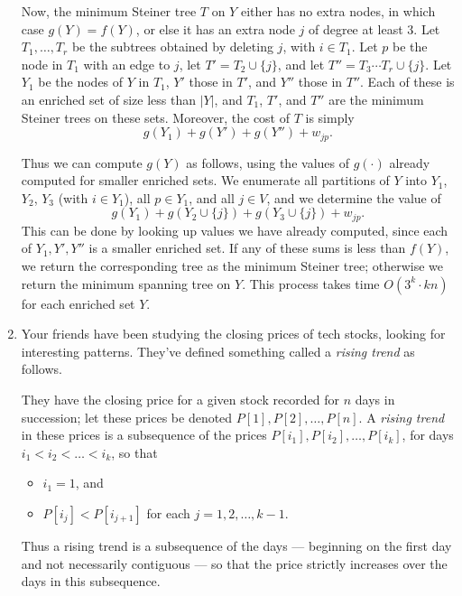 \documentclass[12pt]{article}
\begin{document}
\begin{enumerate}
{Now, the minimum Steiner tree $T$ on $Y$ either has no extra nodes,
in which case $g(Y) = f(Y)$, or else it has an
extra node $j$ of degree at least $3$.
Let $T_1, \ldots, T_r$ be the subtrees obtained by
deleting $j$, with $i \in T_1$.
Let $p$ be the node in $T_1$ with an edge to $j$,
let $T' = T_2 \cup \{j\}$, and let
$T'' = T_3 \cdots T_r \cup \{j\}$.
Let $Y_1$ be the nodes of $Y$ in $T_1$,
$Y'$ those in $T'$, and $Y''$ those in $T''$.
Each of these is an enriched set of size less than $|Y|$,
and $T_1$, $T'$, and $T''$ are the minimum Steiner trees on these sets.
Moreover, the cost of $T$ is simply
$$g(Y_1) + g(Y') + g(Y'') + w_{jp}.$$

Thus we can compute $g(Y)$ as follows, using
the values of $g(\cdot)$ already computed for smaller enriched sets.
We enumerate
all partitions of $Y$ into $Y_1$, $Y_2$, $Y_3$
(with $i \in Y_1$),
all $p \in Y_1$, and all $j \in V$, and we determine the value of
$$g(Y_1) + g(Y_2 \cup \{j\}) + g(Y_3 \cup \{j\}) + w_{jp}.$$
This can be done by looking up values we have already
computed, since each of $Y_1, Y', Y''$ is a smaller enriched set.
If any of these sums is less than $f(Y)$, we return
the corresponding tree as the minimum Steiner tree;
otherwise we return the minimum spanning tree on $Y$.
This process takes time $O(3^k \cdot kn)$ for each enriched set $Y$.

}




\item

Your friends have been studying the closing prices of tech stocks,
looking for interesting patterns.
They've defined something called a {\em rising trend} as follows.

They have the closing price for a given stock recorded for
$n$ days in succession;
let these prices be denoted $P[1], P[2], \ldots, P[n]$.
A {\em rising trend} in these prices is a subsequence
of the prices $P[i_1], P[i_2], \ldots, P[i_k]$,
for days $i_1 < i_2 < \ldots < i_k$, so that
\begin{itemize}
\item $i_1 = 1$, and
\item $P[i_j] < P[i_{j+1}]$ for each $j = 1, 2, \ldots, k-1$.
\end{itemize}
Thus a rising trend is a subsequence of the days
--- beginning on the first day and not necessarily contiguous ---
so that the price strictly increases over the days
in this subsequence.


\end{enumerate}
\end{document}

